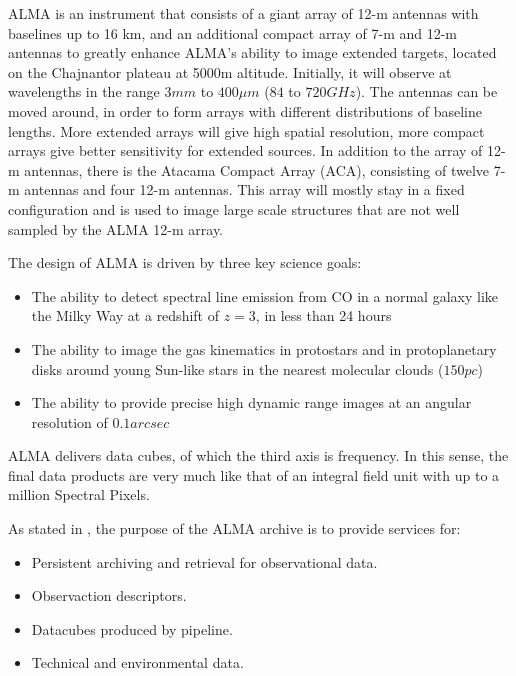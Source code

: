 ALMA is an instrument that consists of a giant array of 12-m antennas with baselines up to 16 km, and an additional compact array of 7-m and 12-m antennas to greatly enhance ALMA's ability to image extended targets, located on the Chajnantor plateau at 5000m altitude. Initially, it will observe at wavelengths in the range $3 mm$ to $400 μm$ ($84$ to $720 GHz$). The antennas can be moved around, in order to form arrays with different distributions of baseline lengths. More extended arrays will give high spatial resolution, more compact arrays give better sensitivity for extended sources. In addition to the array of 12-m antennas, there is the Atacama Compact Array (ACA), consisting of twelve 7-m antennas and four 12-m antennas. This array will mostly stay in a fixed configuration and is used to image large scale structures that are not well sampled by the ALMA 12-m array. \newline

The design of ALMA is driven by three key science goals:

\begin{itemize}

\item The ability to detect spectral line emission from CO in a normal galaxy like the Milky Way at a redshift of $z=3$, in less than 24 hours

\item The ability to image the gas kinematics in protostars and in protoplanetary disks around young Sun-like stars in the nearest molecular clouds ($150 pc$)

\item The ability to provide precise high dynamic range images at an angular resolution of $0.1 arcsec$
\end{itemize}
 
ALMA delivers data cubes, of which the third axis is frequency. In this sense, the final data products are very much like that of an integral field unit with up to a million Spectral Pixels. \newline

As stated in \cite{Etoka12}, the purpose of the ALMA archive is to provide services for:

\begin{itemize}
\item Persistent archiving and retrieval for observational data.
\item Observaction descriptors.
\item Datacubes produced by pipeline.
\item Technical and environmental data.
\end{itemize}

